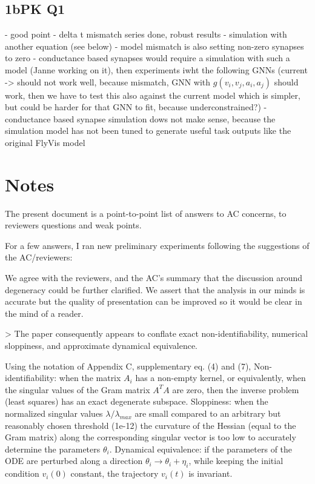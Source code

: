 \documentclass[11pt]{article}
\begin{document}
\subsection{1bPK Q1}

- good point
- delta t mismatch series done, robust results
- simulation with another equation (see below)
- model mismatch is also setting non-zero synapses to zero
- conductance based synapses would require a simulation with such a model (Janne working on it), then experiments iwht the following GNNs (current -> should not work well, because mismatch, GNN with $g(v_i,v_j,a_i,a_j)$ should work, then we have to test this also against the current model which is simpler, but could be harder for that GNN to fit, because underconstrained?)
  - conductance based synapse simulation dows not make sense, because the simulation model has not been tuned to generate useful task outputs like the original FlyVis model

\section{Notes}

The present document is a point-to-point list of answers to AC concerns, to reviewers questions and weak points. 

For a few answers, I ran new preliminary experiments following the suggestions of the AC/reviewers:

We agree with the reviewers, and the AC's summary that the discussion around degeneracy could be further clarified. We assert that the analysis in our minds is accurate but the quality of presentation can be improved so it would be clear in the mind of a reader.

> The paper consequently appears to conflate exact non-identifiability, numerical sloppiness, and approximate dynamical equivalence.

Using the notation of Appendix C, supplementary eq. (4) and (7),
Non-identifiability: when the matrix $A_i$ has a non-empty kernel, or equivalently, when the singular values of the Gram matrix $A^T A$ are zero, then the inverse problem (least squares) has an exact degenerate subspace.
Sloppiness: when the normalized singular values $\lambda / \lambda_{max}$ are small compared to an arbitrary but reasonably chosen threshold (1e-12) the curvature of the Hessian (equal to the Gram matrix) along the corresponding singular vector is too low to accurately determine the parameters $\theta_i$.
Dynamical equivalence: if the parameters of the ODE are perturbed along a direction $\theta_i \rightarrow \theta_i + \eta_i$, while keeping the initial condition $v_i(0)$ constant, the trajectory $v_i(t)$ is invariant.
\end{document}
